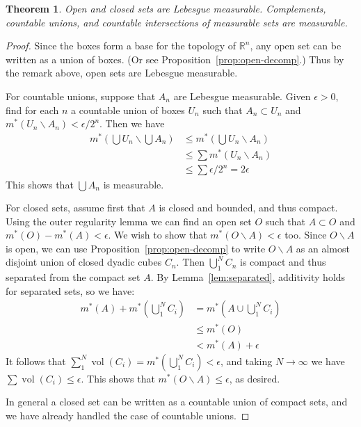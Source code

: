 \documentclass[11pt,oneside]{amsbook}
\renewcommand{\setminus}{\smallsetminus}
\newcommand{\RR}{{\mathbb R}}
\DeclareMathOperator{\vol}{vol}
\theoremstyle{definition}
\theoremstyle{plain}
\newtheorem{thm}{Theorem}[section]
\theoremstyle{definition}
\theoremstyle{remark}
\numberwithin{equation}{section}
\numberwithin{figure}{section}
\begin{document}
\begin{thm}
  Open and closed sets are Lebesgue measurable. Complements, countable unions, and countable intersections of measurable sets are measurable.
\end{thm}

\begin{proof}
  Since the boxes form a base for the topology of $\RR^n$, any open set can be written as a union of boxes. (Or see Proposition~\ref{prop:open-decomp}.) Thus by the remark above, open sets are Lebesgue measurable.

  For countable unions, suppose that $A_n$ are Lebesgue measurable. Given $\epsilon>0$, find for each $n$ a countable union of boxes $U_n$ such that $A_n\subset U_n$ and $m^*(U_n\setminus A_n)<\epsilon/2^n$. Then we have
  \begin{align*}
    m^*(\bigcup U_n\smallsetminus\bigcup A_n)
    &\leq m^*(\bigcup U_n\setminus A_n)\\
    &\leq \sum m^*(U_n\setminus A_n)\\
    &\leq \sum \epsilon/2^n=2\epsilon
  \end{align*}
  This shows that $\bigcup A_n$ is measurable.

  For closed sets, assume first that $A$ is closed and bounded, and thus compact. Using the outer regularity lemma we can find an open set $O$ such that $A\subset O$ and $m^*(O)-m^*(A)<\epsilon$. We wish to show that $m^*(O\setminus A)<\epsilon$ too. Since $O\setminus A$ is open, we can use Proposition~\ref{prop:open-decomp} to write $O\setminus A$ as an almost disjoint union of closed dyadic cubes $C_n$. Then $\bigcup_1^N C_n$ is compact and thus separated from the compact set $A$. By Lemma~\ref{lem:separated}, additivity holds for separated sets, so we have:
  \begin{align*}
    m^*(A)+m^*(\bigcup_1^N C_i)&=m^*(A\cup\bigcup_1^N C_i)\\
                              &\leq m^*(O)\\
                              &<m^*(A)+\epsilon
  \end{align*}
  It follows that $\sum_1^N\vol(C_i)=m^*(\bigcup_1^NC_i)<\epsilon$, and taking $N\to\infty$ we have $\sum\vol(C_i)\leq\epsilon$. This shows that $m^*(O\setminus A)\leq\epsilon$, as desired.

  In general a closed set can be written as a countable union of compact sets, and we have already handled the case of countable unions.


\end{proof}
\end{document}
